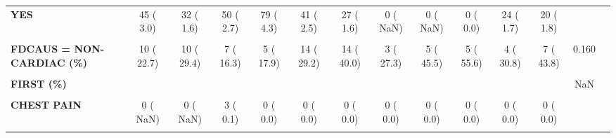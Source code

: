 \documentclass[
]{article}
\begin{document}
\begin{table}[H]
\begin{tabular}[t]{>{\raggedright\arraybackslash}p{5em}ccccccccccccc}
\textbf{YES} & 45 (  3.0) & 32 (  1.6) & 50 (  2.7) & 79 (  4.3) & 41 (  2.5) & 27 (  1.6) & 0 (  NaN) & 0 (  NaN) & 0 (  0.0) & 24 (  1.7) & 20 (  1.8) &  & \\
\textbf{\cellcolor{gray!10}{FCHFH = YES (\%)}} & \cellcolor{gray!10}{45 (100.0)} & \cellcolor{gray!10}{32 (100.0)} & \cellcolor{gray!10}{50 (100.0)} & \cellcolor{gray!10}{37 ( 53.6)} & \cellcolor{gray!10}{26 ( 65.0)} & \cellcolor{gray!10}{21 ( 80.8)} & \cellcolor{gray!10}{0 (  NaN)} & \cellcolor{gray!10}{0 (  NaN)} & \cellcolor{gray!10}{0 (  NaN)} & \cellcolor{gray!10}{14 ( 70.0)} & \cellcolor{gray!10}{12 ( 63.2)} & \cellcolor{gray!10}{NaN} & \cellcolor{gray!10}{}\\
\textbf{FDCAUS = NON-CARDIAC (\%)} & 10 ( 22.7) & 10 ( 29.4) & 7 ( 16.3) & 5 ( 17.9) & 14 ( 29.2) & 14 ( 40.0) & 3 ( 27.3) & 5 ( 45.5) & 5 ( 55.6) & 4 ( 30.8) & 7 ( 43.8) & 0.160 & \\
\textbf{\cellcolor{gray!10}{FIBR\_CHR = YES (\%)}} & \cellcolor{gray!10}{0 (  NaN)} & \cellcolor{gray!10}{57 (  2.8)} & \cellcolor{gray!10}{57 (  2.8)} & \cellcolor{gray!10}{87 (  4.3)} & \cellcolor{gray!10}{74 (  4.3)} & \cellcolor{gray!10}{76 (  4.3)} & \cellcolor{gray!10}{66 (  3.5)} & \cellcolor{gray!10}{46 (  4.6)} & \cellcolor{gray!10}{34 (  4.7)} & \cellcolor{gray!10}{39 (  2.2)} & \cellcolor{gray!10}{14 (  0.8)} & \cellcolor{gray!10}{NaN} & \cellcolor{gray!10}{}\\
\textbf{FIRST (\%)} &  &  &  &  &  &  &  &  &  &  &  & NaN & \\
\textbf{\cellcolor{gray!10}{CCU OR CATH LAB}} & \cellcolor{gray!10}{0 (  NaN)} & \cellcolor{gray!10}{0 (  NaN)} & \cellcolor{gray!10}{176 (  8.6)} & \cellcolor{gray!10}{178 (  9.0)} & \cellcolor{gray!10}{213 ( 12.3)} & \cellcolor{gray!10}{272 ( 15.4)} & \cellcolor{gray!10}{293 ( 15.5)} & \cellcolor{gray!10}{328 ( 18.3)} & \cellcolor{gray!10}{336 ( 18.9)} & \cellcolor{gray!10}{416 ( 23.8)} & \cellcolor{gray!10}{423 ( 24.6)} & \cellcolor{gray!10}{} & \cellcolor{gray!10}{}\\
\textbf{CHEST PAIN} & 0 (  NaN) & 0 (  NaN) & 3 (  0.1) & 0 (  0.0) & 0 (  0.0) & 0 (  0.0) & 0 (  0.0) & 0 (  0.0) & 0 (  0.0) & 0 (  0.0) & 0 (  0.0) &  & \\
\textbf{\cellcolor{gray!10}{ER}} & \cellcolor{gray!10}{0 (  NaN)} & \cellcolor{gray!10}{0 (  NaN)} & \cellcolor{gray!10}{1874 ( 91.3)} & \cellcolor{gray!10}{1810 ( 91.0)} & \cellcolor{gray!10}{1522 ( 87.7)} & \cellcolor{gray!10}{1489 ( 84.6)} & \cellcolor{gray!10}{1592 ( 84.5)} & \cellcolor{gray!10}{1463 ( 81.7)} & \cellcolor{gray!10}{1430 ( 80.4)} & \cellcolor{gray!10}{1307 ( 74.7)} & \cellcolor{gray!10}{1273 ( 74.0)} & \cellcolor{gray!10}{} & \cellcolor{gray!10}{}\\

\end{tabular}
\end{table}
\end{document}
